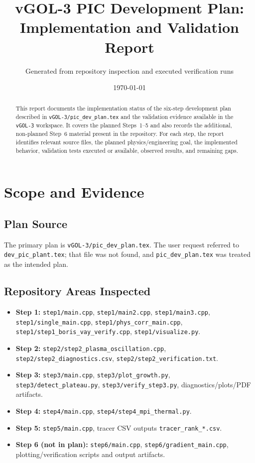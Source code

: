 \documentclass[11pt,a4paper]{article}
\title{vGOL-3 PIC Development Plan:\\Implementation and Validation Report}
\author{Generated from repository inspection and executed verification runs}
\date{\today}
\begin{document}
\maketitle

\begin{abstract}
This report documents the implementation status of the six-step development plan described in \texttt{vGOL-3/pic\_dev\_plan.tex} and the validation evidence available in the \texttt{vGOL-3} workspace. It covers the planned Steps~1--5 and also records the additional, non-planned Step~6 material present in the repository. For each step, the report identifies relevant source files, the planned physics/engineering goal, the implemented behavior, validation tests executed or available, observed results, and remaining gaps.
\end{abstract}

\tableofcontents
\newpage

\section{Scope and Evidence}

\subsection{Plan Source}
The primary plan is \texttt{vGOL-3/pic\_dev\_plan.tex}. The user request referred to \texttt{dev\_pic\_plant.tex}; that file was not found, and \texttt{pic\_dev\_plan.tex} was treated as the intended plan.

\subsection{Repository Areas Inspected}
\begin{itemize}[leftmargin=*]
  \item \textbf{Step 1:} \texttt{step1/main.cpp}, \texttt{step1/main2.cpp}, \texttt{step1/main3.cpp}, \texttt{step1/single\_main.cpp}, \texttt{step1/phys\_corr\_main.cpp}, \texttt{step1/step1\_boris\_vay\_verify.cpp}, \texttt{step1/visualize.py}.
  \item \textbf{Step 2:} \texttt{step2/step2\_plasma\_oscillation.cpp}, \texttt{step2/step2\_diagnostics.csv}, \texttt{step2/step2\_verification.txt}.
  \item \textbf{Step 3:} \texttt{step3/main.cpp}, \texttt{step3/plot\_growth.py}, \texttt{step3/detect\_plateau.py}, \texttt{step3/verify\_step3.py}, diagnostics/plots/PDF artifacts.
  \item \textbf{Step 4:} \texttt{step4/main.cpp}, \texttt{step4/step4\_mpi\_thermal.py}.
  \item \textbf{Step 5:} \texttt{step5/main.cpp}, tracer CSV outputs \texttt{tracer\_rank\_*.csv}.
  \item \textbf{Step 6 (not in plan):} \texttt{step6/main.cpp}, \texttt{step6/gradient\_main.cpp}, plotting/verification scripts and output artifacts.
\end{itemize}
\end{document}
